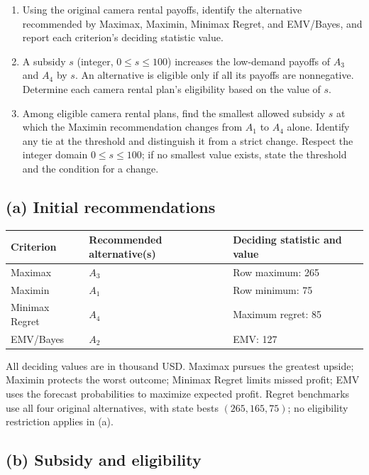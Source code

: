 \begin{enumerate}[label=\textbf{(\alph*)},leftmargin=*]
	\item Using the original camera rental payoffs, identify the alternative recommended by Maximax, Maximin, Minimax Regret, and EMV/Bayes, and report each criterion's deciding statistic value. 

	\item A subsidy $s$ (integer, $0\leq s\leq100$) increases the low-demand payoffs of $A_3$ and $A_4$ by $s$. An alternative is eligible only if all its payoffs are nonnegative. Determine each camera rental plan's eligibility based on the value of $s$. 

	\item Among eligible camera rental plans, find the smallest allowed subsidy $s$ at which the Maximin recommendation changes from $A_1$ to $A_4$ alone. Identify any tie at the threshold and distinguish it from a strict change. Respect the integer domain $0\leq s\leq100$; if no smallest value exists, state the threshold and the condition for a change. 
\end{enumerate}
\label{sol:q1a}
\subsection*{(a) Initial recommendations }
\begin{center}
\begin{tabular}{lll}\toprule
Criterion & Recommended alternative(s) & Deciding statistic and value\\ \midrule
		Maximax & $A_3$ & Row maximum: 265\\
		Maximin & $A_1$ & Row minimum: 75\\
		Minimax Regret & $A_4$ & Maximum regret: 85\\
		EMV/Bayes & $A_2$ & EMV: 127\\
		\bottomrule\end{tabular}
\end{center}
All deciding values are in thousand USD. Maximax pursues the greatest upside; Maximin protects the worst outcome; Minimax Regret limits missed profit; EMV uses the forecast probabilities to maximize expected profit. Regret benchmarks use all four original alternatives, with state bests $(265,165,75)$; no eligibility restriction applies in (a).
\secInicio[sec:q1]


\label{sol:q1b}
\subsection*{(b) Subsidy and eligibility }

